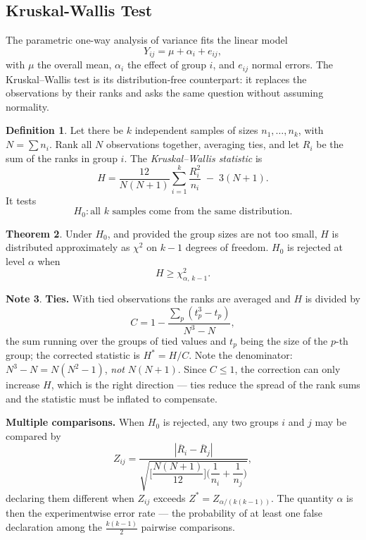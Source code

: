 \documentclass[11pt,a4paper]{article}
\theoremstyle{definition}
\newtheorem{thm}{Theorem}[section]
\newtheorem{definition}[thm]{Definition}
\newtheorem{note}[thm]{Note}
\begin{document}
\subsection{Kruskal-Wallis Test}

The parametric one-way analysis of variance fits the linear model
$$Y_{ij} = \mu + \alpha_i + e_{ij},$$
with $\mu$ the overall mean, $\alpha_i$ the effect of group $i$, and $e_{ij}$
normal errors. The Kruskal--Wallis test is its distribution-free counterpart: it
replaces the observations by their ranks and asks the same question without
assuming normality.

\begin{definition}
Let there be $k$ independent samples of sizes $n_1,\ldots,n_k$, with
$N = \sum n_i$. Rank all $N$ observations together, averaging ties, and let $R_i$
be the sum of the ranks in group $i$. The \emph{Kruskal--Wallis statistic} is
$$H = \dfrac{12}{N(N+1)}\sum^{k}_{i=1}\dfrac{R_i^{2}}{n_i} \;-\; 3(N+1).$$
It tests
$$H_0 : \text{all } k \text{ samples come from the same distribution.}$$
\end{definition}

\begin{thm}
Under $H_0$, and provided the group sizes are not too small, $H$ is distributed
approximately as $\chi^{2}$ on $k-1$ degrees of freedom. $H_0$ is rejected at level
$\alpha$ when
$$H \geq \chi^{2}_{\alpha,\,k-1}.$$
\end{thm}

\begin{note}
\textbf{Ties.} With tied observations the ranks are averaged and $H$ is divided by
$$C = 1 - \dfrac{\sum_{p}\left(t_p^{3} - t_p\right)}{N^{3} - N},$$
the sum running over the groups of tied values and $t_p$ being the size of the
$p$-th group; the corrected statistic is $H^{*} = H/C$. Note the denominator:
$N^{3} - N = N(N^{2}-1)$, \emph{not} $N(N+1)$. Since $C \leq 1$, the correction can
only increase $H$, which is the right direction --- ties reduce the spread of the
rank sums and the statistic must be inflated to compensate.
\end{note}

\textbf{Multiple comparisons.} When $H_0$ is rejected, any two groups $i$ and $j$
may be compared by
$$Z_{ij} = \dfrac{\left|\overline{R}_i - \overline{R}_j\right|}
{\sqrt{\Bigg[\dfrac{N(N+1)}{12}\Bigg]\Bigg(\dfrac{1}{n_i}+\dfrac{1}{n_j}\Bigg)}},$$
declaring them different when $Z_{ij}$ exceeds
$Z^{*} = Z_{\alpha/(k(k-1))}$. The quantity $\alpha$ is then the experimentwise
error rate --- the probability of at least one false declaration among the
$\frac{k(k-1)}{2}$ pairwise comparisons.
\end{document}
